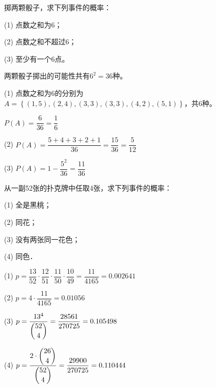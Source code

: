 \documentclass[lang=cn,newtx,10pt,scheme=chinese]{elegantbook}
\begin{document}
\begin{problemset}[习题 1.2]
    \item 掷两颗骰子，求下列事件的概率：
    \item[(1)] 点数之和为6；
    \item[(2)] 点数之和不超过6；
    \item[(3)] 至少有一个6点。
    \begin{solution}
        \begin{framed}
            两颗骰子掷出的可能性共有$6^2=36$种。
            \item[(1)] 点数之和为6的分别为$A=\left\{(1,5),(2,4),(3,3),(3,3),(4,2),(5,1)\right\}$，共6种。\vspace{6pt}
            \item[] $P(A)=\dfrac{6}{36}=\dfrac{1}{6}$\vspace{6pt}
            \item[(2)] $P(A) = \dfrac{5+4+3+2+1}{36}=\dfrac{15}{36}=\dfrac{5}{12}$\vspace{6pt}
            \item[(3)] $P(A) = 1- \dfrac{5^2}{36} = \dfrac{11}{36}$\vspace{6pt}
        \end{framed}
    \end{solution}
    \newpage

    \item 从一副52张的扑克牌中任取4张，求下列事件的概率：
    \item[(1)] 全是黑桃；
    \item[(2)] 同花；
    \item[(3)] 没有两张同一花色；
    \item[(4)] 同色．
    \begin{solution}
        \begin{framed}
            \item[(1)] $p=\dfrac{13}{52} \cdot \dfrac{12}{51} \cdot \dfrac{11}{50} \cdot \dfrac{10}{49} = \dfrac{11}{4165} = 0.002641$
            \vspace{6pt}
            \item[(2)] $p=4 \cdot \dfrac{11}{4165} = 0.01056$
            \vspace{6pt}
            \item[(3)] $p= \dfrac{13^4}{\dbinom{52}{4}} = \dfrac{28561}{270725} = 0.105498$
            \vspace{6pt}
            \item[(4)] $p=\dfrac{2 \cdot \dbinom{26}{4}}{\dbinom{52}{4}} = \dfrac{29900}{270725} = 0.110444$
        \end{framed}
    \end{solution}


\end{problemset}
\end{document}
